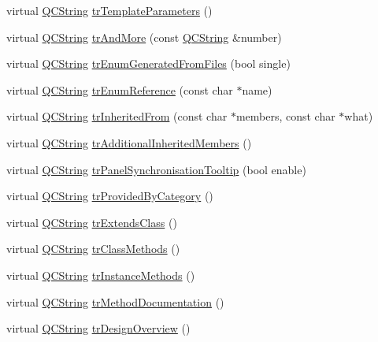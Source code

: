 \begin{DoxyCompactItemize}
\item 
virtual \mbox{\hyperlink{class_q_c_string}{Q\+C\+String}} \mbox{\hyperlink{class_translator_esperanto_a93ee32cd327e2c858892d3068f628bb5}{tr\+Template\+Parameters}} ()
\item 
virtual \mbox{\hyperlink{class_q_c_string}{Q\+C\+String}} \mbox{\hyperlink{class_translator_esperanto_a6e7c58663437fff2ff2937bdcbc72fe8}{tr\+And\+More}} (const \mbox{\hyperlink{class_q_c_string}{Q\+C\+String}} \&number)
\item 
virtual \mbox{\hyperlink{class_q_c_string}{Q\+C\+String}} \mbox{\hyperlink{class_translator_esperanto_abf13ca341f52a58c933d7fd8450dc1ad}{tr\+Enum\+Generated\+From\+Files}} (bool single)
\item 
virtual \mbox{\hyperlink{class_q_c_string}{Q\+C\+String}} \mbox{\hyperlink{class_translator_esperanto_a506e838aeb61d235bd6571ffcc2d1804}{tr\+Enum\+Reference}} (const char $\ast$name)
\item 
virtual \mbox{\hyperlink{class_q_c_string}{Q\+C\+String}} \mbox{\hyperlink{class_translator_esperanto_a4cbd025a08d322454c38971a2c4eda89}{tr\+Inherited\+From}} (const char $\ast$members, const char $\ast$what)
\item 
virtual \mbox{\hyperlink{class_q_c_string}{Q\+C\+String}} \mbox{\hyperlink{class_translator_esperanto_aef57799418ceda7d5e030c1f0f4e0a2a}{tr\+Additional\+Inherited\+Members}} ()
\item 
virtual \mbox{\hyperlink{class_q_c_string}{Q\+C\+String}} \mbox{\hyperlink{class_translator_esperanto_a3e16b5facc6017269b0b67c393cfc954}{tr\+Panel\+Synchronisation\+Tooltip}} (bool enable)
\item 
virtual \mbox{\hyperlink{class_q_c_string}{Q\+C\+String}} \mbox{\hyperlink{class_translator_esperanto_a0884c67bbbd62a57dff458c7e0bbccdc}{tr\+Provided\+By\+Category}} ()
\item 
virtual \mbox{\hyperlink{class_q_c_string}{Q\+C\+String}} \mbox{\hyperlink{class_translator_esperanto_a0402120451d994d7d2eec8d50cd9ec7a}{tr\+Extends\+Class}} ()
\item 
virtual \mbox{\hyperlink{class_q_c_string}{Q\+C\+String}} \mbox{\hyperlink{class_translator_esperanto_a8ab3d64e0f5a2bb24e8164e4ec35817a}{tr\+Class\+Methods}} ()
\item 
virtual \mbox{\hyperlink{class_q_c_string}{Q\+C\+String}} \mbox{\hyperlink{class_translator_esperanto_a2f78ff2e2f94b3c82fbbeaec27454b75}{tr\+Instance\+Methods}} ()
\item 
virtual \mbox{\hyperlink{class_q_c_string}{Q\+C\+String}} \mbox{\hyperlink{class_translator_esperanto_a11d39ce9aa3daa1eb9623243a36abde1}{tr\+Method\+Documentation}} ()
\item 
virtual \mbox{\hyperlink{class_q_c_string}{Q\+C\+String}} \mbox{\hyperlink{class_translator_esperanto_a3a86c34d416f0357cc44c8592852da5d}{tr\+Design\+Overview}} ()
\end{DoxyCompactItemize}
